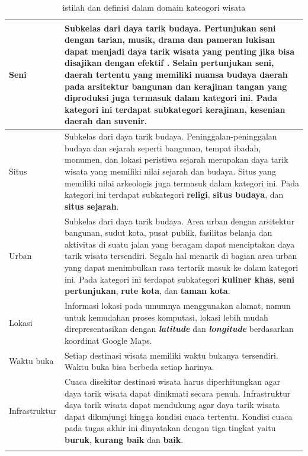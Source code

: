 \begin{center}
\begin{longtable}{ |l|m{10cm}| }
	\hline
	Seni & Subkelas dari daya tarik budaya. Pertunjukan seni dengan tarian, musik, drama dan pameran lukisan dapat menjadi daya tarik wisata yang
	penting jika bisa disajikan dengan efektif \cite{inskeep1991tourism}. Selain pertunjukan seni, daerah tertentu yang memiliki nuansa budaya
	daerah pada arsitektur bangunan dan kerajinan tangan yang diproduksi juga termasuk dalam kategori ini.
	Pada kategori ini terdapat subkategori \textbf{kerajinan}, \textbf{kesenian daerah} dan \textbf{suvenir}.\\
	\hline
	Situs & Subkelas dari daya tarik budaya. Peninggalan-peninggalan budaya dan sejarah seperti bangunan, tempat ibadah, monumen, 
	dan lokasi peristiwa sejarah merupakan daya tarik wisata yang memiliki nilai sejarah dan budaya. Situs yang memiliki nilai arkeologis juga termasuk
	dalam kategori ini.
	Pada kategori ini terdapat subkategori \textbf{religi}, \textbf{situs budaya}, dan \textbf{situs sejarah}.\\
	\hline
	Urban & Subkelas dari daya tarik budaya. Area urban dengan arsitektur bangunan, sudut kota, pusat publik, fasilitas belanja dan aktivitas di suatu jalan
	yang beragam dapat menciptakan daya tarik wisata tersendiri. Segala hal menarik di bagian area urban yang dapat menimbulkan rasa tertarik
	masuk ke dalam kategori ini. Pada kategori ini terdapat subkategori \textbf{kuliner khas}, \textbf{seni pertunjukan}, \textbf{rute kota},
	dan \textbf{taman kota}.\\
	\hline
	Lokasi & Informasi lokasi pada umumnya menggunakan alamat, namun untuk kemudahan proses komputasi, lokasi lebih mudah direpresentasikan
	dengan \textit{\textbf{latitude}} dan \textit{\textbf{longitude}} berdasarkan koordinat Google Maps.\\
	\hline
	Waktu buka & Setiap destinasi wisata memiliki waktu bukanya tersendiri. Waktu buka bisa berbeda setiap harinya. \\ 
	\hline
	Infrastruktur & Cuaca disekitar destinasi wisata harus diperhitungkan agar daya tarik wisata dapat dinikmati secara penuh. Infrastruktur
	daya tarik wisata dapat mendukung agar daya tarik wisata dapat dikunjungi hingga kondisi cuaca tertentu. Kondisi cuaca pada tugas akhir ini
	dinyatakan dengan tiga tingkat yaitu \textbf{buruk}, \textbf{kurang baik} dan \textbf{baik}.\\ 
	\hline
\caption{istilah dan definisi dalam domain kateogori wisata}
\label{table:concept-table}
\end{longtable}
\end{center}

